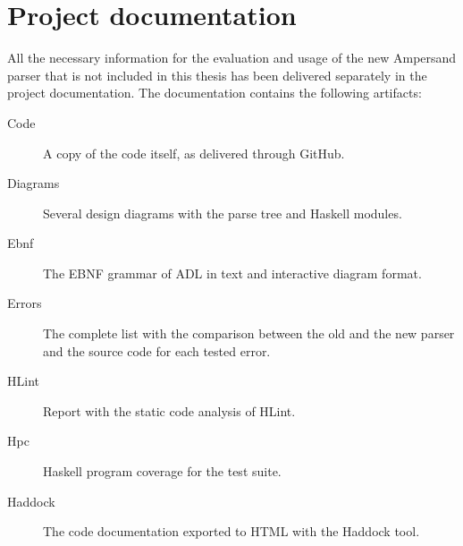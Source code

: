 
\section*{Project documentation}
\label{app:docs}
All the necessary information for the evaluation and usage of the new Ampersand parser that is not included in this thesis has been delivered separately in the project documentation.
The documentation contains the following artifacts:
\begin{description}
  \item [Code] A copy of the code itself, as delivered through GitHub.
  \item [Diagrams] Several design diagrams with the parse tree and Haskell modules.
  \item [Ebnf] The EBNF grammar of ADL in text and interactive diagram format.
  \item [Errors] The complete list with the comparison between the old and the new parser and the source code for each tested error.
  \item [HLint] Report with the static code analysis of HLint.
  \item [Hpc] Haskell program coverage for the test suite.
  \item [Haddock] The code documentation exported to HTML with the Haddock tool.
\end{description}
